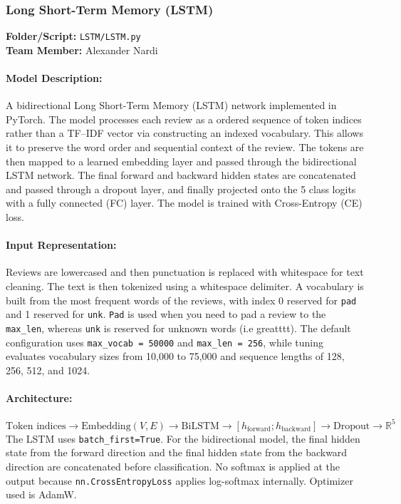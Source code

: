 \documentclass[12pt]{article}
\begin{document}
\subsubsection{Long Short-Term Memory (LSTM)}
\textbf{Folder/Script:} \texttt{LSTM/LSTM.py}\\
\textbf{Team Member:} Alexander Nardi

\paragraph{Model Description:}
A bidirectional Long Short-Term Memory (LSTM) network implemented in PyTorch. The model processes each review as a ordered sequence of token indices rather than a TF--IDF vector via constructing an indexed vocabulary. This allows it to preserve the word order and sequential context of the review. The tokens are then mapped to a learned embedding layer and passed through the bidirectional LSTM network. The final forward and backward hidden states are concatenated and passed through a dropout layer, and finally projected onto the 5 class logits with a fully connected (FC) layer. The model is trained with Cross-Entropy (CE) loss.

\paragraph{Input Representation:}
Reviews are lowercased and then punctuation is replaced with whitespace for text cleaning. The text is then tokenized using a whitespace delimiter. A vocabulary is built from the most frequent words of the reviews, with index 0 reserved for \texttt{pad} and 1 reserved for \texttt{unk}. \texttt{Pad} is used when you need to pad a review to the \texttt{max\_len}, whereas \texttt{unk} is reserved for unknown words (i.e greatttt). The default configuration uses \texttt{max\_vocab = 50000} and \texttt{max\_len = 256}, while tuning evaluates vocabulary sizes from 10,000 to 75,000 and sequence lengths of 128, 256, 512, and 1024.

\paragraph{Architecture:}
\[
\text{Token indices}
\to \text{Embedding}(V, E)
\to \text{BiLSTM}
\to [h_{\text{forward}}; h_{\text{backward}}]
\to \text{Dropout}
\to \mathbb{R}^{5}
\]
The LSTM uses \texttt{batch\_first=True}. For the bidirectional model, the final hidden state from the forward direction and the final hidden state from the backward direction are concatenated before classification. No softmax is applied at the output because \texttt{nn.CrossEntropyLoss} applies log-softmax internally. Optimizer used is AdamW.
\end{document}
